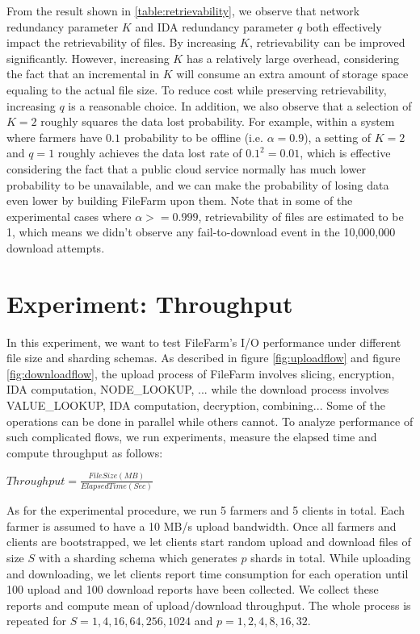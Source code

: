From the result shown in \ref{table:retrievability}, we observe that network redundancy parameter $K$ and IDA redundancy parameter $q$ both effectively impact the retrievability of files. By increasing $K$, retrievability can be improved significantly. However, increasing $K$ has a relatively large overhead, considering the fact that an incremental in $K$ will consume an extra amount of storage space equaling to the actual file size. To reduce cost while preserving retrievability, increasing $q$ is a reasonable choice. In addition, we also observe that a selection of $K=2$ roughly squares the data lost probability. For example, within a system where farmers have $0.1$ probability to be offline (i.e. $\alpha=0.9$), a setting of $K=2$ and $q=1$ roughly achieves the data lost rate of $0.1^{2}=0.01$, which is effective considering the fact that a public cloud service normally has much lower probability to be unavailable, and we can make the probability of losing data even lower by building FileFarm upon them. Note that in some of the experimental cases where $\alpha>=0.999$, retrievability of files are estimated to be 1, which means we didn't observe any fail-to-download event in the 10,000,000 download attempts.

\section{Experiment: Throughput}
\label{s:expthroughput}

In this experiment, we want to test FileFarm's I/O performance under different file size and sharding schemas. As described in figure \ref{fig:uploadflow} and figure \ref{fig:downloadflow}, the upload process of FileFarm involves slicing, encryption, IDA computation, NODE\_LOOKUP, ... while the download process involves VALUE\_LOOKUP, IDA computation, decryption, combining... Some of the operations can be done in parallel while others cannot. To analyze performance of such complicated flows, we run experiments, measure the elapsed time and compute throughput as follows:

\begin{center}
  $Throughput = \frac{File Size(MB)}{Elapsed Time(Sec)}$
\end{center}

As for the experimental procedure, we run 5 farmers and 5 clients in total. Each farmer is assumed to have a 10 MB/s upload bandwidth. Once all farmers and clients are bootstrapped, we let clients start random upload and download files of size $S$ with a sharding schema which generates $p$ shards in total. While uploading and downloading, we let clients report time consumption for each operation until 100 upload and 100 download reports have been collected. We collect these reports and compute mean of upload/download throughput. The whole process is repeated for $S=1,4,16,64,256,1024$ and $p=1,2,4,8,16,32$.

